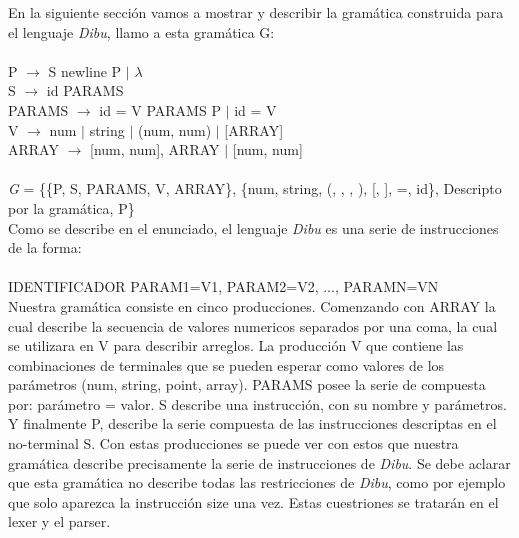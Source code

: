 En la siguiente sección vamos a mostrar y describir la gramática construida para el lenguaje \textit{Dibu}, llamo a esta
gramática G:\\
\\
P $\rightarrow$ S newline P $\mid$ $\lambda$\\
S $\rightarrow$ id PARAMS\\
PARAMS $\rightarrow$  id = V PARAMS P $\mid$ id = V\\
V $\rightarrow$ num $\mid$ string $\mid$ (num, num) $\mid$ [ARRAY]\\
ARRAY $\rightarrow$ [num, num], ARRAY $\mid$ [num, num]\\
\\
\textit{G} = \{\{P, S, PARAMS, V, ARRAY\}, \{num, string, (, , , ), [, ], =, id\}, Descripto por la gramática, P\}\\

Como se describe en el enunciado, el lenguaje \textit{Dibu} es una serie de instrucciones de la forma:\\
\\
IDENTIFICADOR PARAM1=V1, PARAM2=V2, ..., PARAMN=VN\\

Nuestra gramática consiste en cinco producciones. Comenzando con ARRAY la cual describe la secuencia de valores numericos
separados por una coma, la cual se utilizara en V para describir arreglos. La producción V que contiene las combinaciones
de terminales que se pueden esperar como valores de los parámetros (num, string, point, array).
PARAMS posee la serie de compuesta por: parámetro = valor. S describe una instrucción, con su nombre y parámetros. Y
finalmente P, describe la serie compuesta de las instrucciones descriptas en el no-terminal S. Con estas producciones se
puede ver con estos que nuestra gramática describe precisamente la serie de instrucciones de \textit{Dibu}. Se debe
aclarar que esta gramática no describe todas las restricciones de \textit{Dibu}, como por ejemplo que solo aparezca la
instrucción size una vez. Estas cuestriones se tratarán en el lexer y el parser.

